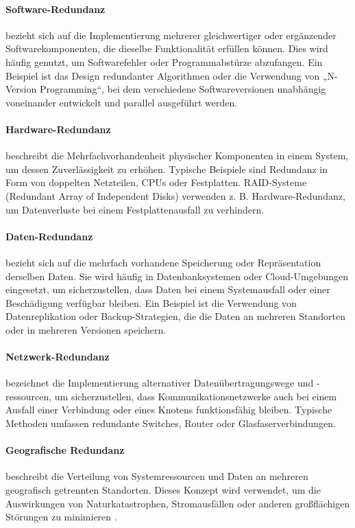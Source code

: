 \paragraph{Software-Redundanz} bezieht sich auf die Implementierung mehrerer gleichwertiger oder ergänzender Softwarekomponenten, die dieselbe Funktionalität erfüllen können. Dies wird häufig genutzt, um Softwarefehler oder Programmabstürze abzufangen. Ein Beispiel ist das Design redundanter Algorithmen oder die Verwendung von „N-Version Programming“, bei dem verschiedene Softwareversionen unabhängig voneinander entwickelt und parallel ausgeführt werden.
\paragraph{Hardware-Redundanz} beschreibt die Mehrfachvorhandenheit physischer Komponenten in einem System, um dessen Zuverlässigkeit zu erhöhen. Typische Beispiele sind Redundanz in Form von doppelten Netzteilen, CPUs oder Festplatten. RAID-Systeme (Redundant Array of Independent Disks) verwenden z. B. Hardware-Redundanz, um Datenverluste bei einem Festplattenausfall zu verhindern.
\paragraph{Daten-Redundanz} bezieht sich auf die mehrfach vorhandene Speicherung oder Repräsentation derselben Daten. Sie wird häufig in Datenbanksystemen oder Cloud-Umgebungen eingesetzt, um sicherzustellen, dass Daten bei einem Systemausfall oder einer Beschädigung verfügbar bleiben. Ein Beispiel ist die Verwendung von Datenreplikation oder Backup-Strategien, die die Daten an mehreren Standorten oder in mehreren Versionen speichern.
\paragraph{Netzwerk-Redundanz} bezeichnet die Implementierung alternativer Datenübertragungswege und -ressourcen, um sicherzustellen, dass Kommunikationsnetzwerke auch bei einem Ausfall einer Verbindung oder eines Knotens funktionsfähig bleiben. Typische Methoden umfassen redundante Switches, Router oder Glasfaserverbindungen. 
\paragraph{Geografische Redundanz} beschreibt die Verteilung von Systemressourcen und Daten an mehreren geografisch getrennten Standorten. Dieses Konzept wird verwendet, um die Auswirkungen von Naturkatastrophen, Stromausfällen oder anderen großflächigen Störungen zu minimieren \cite{g4g-redundancy}.


